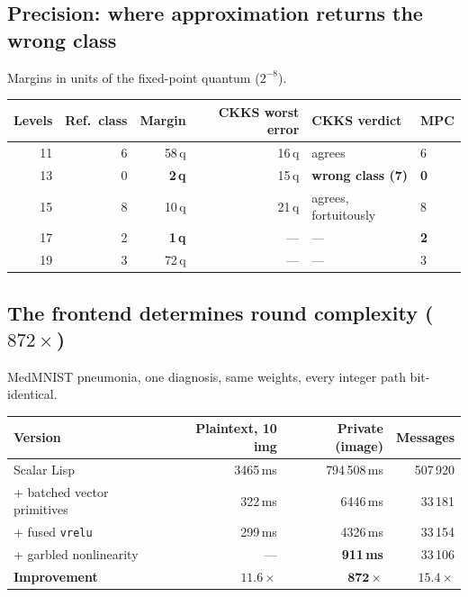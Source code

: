 \documentclass[10pt]{article}
\begin{document}
\subsection{Precision: where approximation returns the wrong class}

Margins in units of the fixed-point quantum ($2^{-8}$).

\begin{center}\small
\begin{tabular}{@{}rrrrll@{}}
\toprule
\textbf{Levels} & \textbf{Ref.\ class} & \textbf{Margin} & \textbf{CKKS worst error} & \textbf{CKKS verdict} & \textbf{MPC} \\
\midrule
11 & 6 & 58\,q & 16\,q & agrees & 6 \\
13 & 0 & \textbf{2\,q} & 15\,q & \textbf{wrong class (7)} & \textbf{0} \\
15 & 8 & 10\,q & 21\,q & agrees, fortuitously & 8 \\
17 & 2 & \textbf{1\,q} & --- & --- & \textbf{2} \\
19 & 3 & 72\,q & --- & --- & 3 \\
\bottomrule
\end{tabular}
\end{center}

\subsection{The frontend determines round complexity ($872\times$)}

MedMNIST pneumonia, one diagnosis, same weights, every integer path bit-identical.

\begin{center}\small
\begin{tabular}{@{}lrrr@{}}
\toprule
\textbf{Version} & \textbf{Plaintext, 10 img} & \textbf{Private (image)} & \textbf{Messages} \\
\midrule
Scalar Lisp & 3465\,ms & 794\,508\,ms & 507\,920 \\
+ batched vector primitives & 322\,ms & 6446\,ms & 33\,181 \\
+ fused \texttt{vrelu} & 299\,ms & 4326\,ms & 33\,154 \\
+ garbled nonlinearity & --- & \textbf{911\,ms} & 33\,106 \\
\midrule
\textbf{Improvement} & $\mathbf{11.6\times}$ & $\mathbf{872\times}$ & $\mathbf{15.4\times}$ \\
\bottomrule
\end{tabular}
\end{center}
\end{document}
